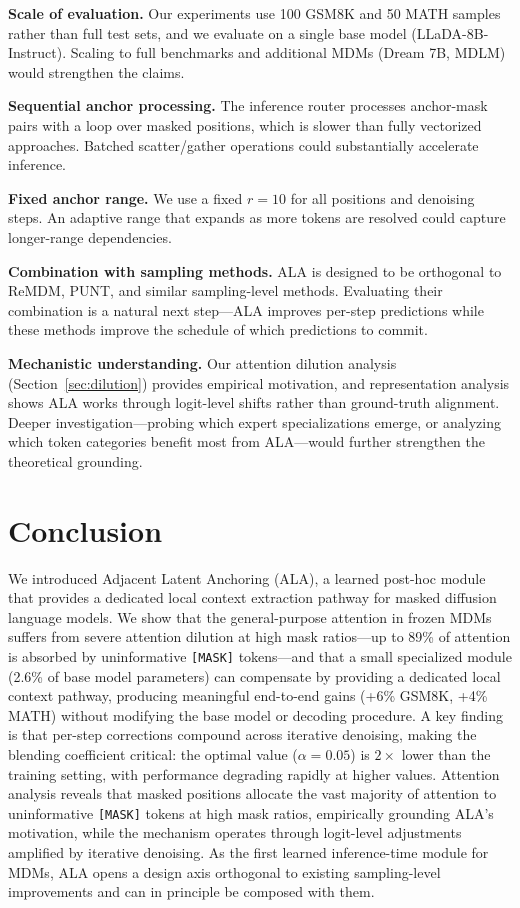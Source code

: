 \documentclass{article} %
\begin{document}
\textbf{Scale of evaluation.}
Our experiments use 100 GSM8K and 50 MATH samples rather than full test sets, and we evaluate on a single base model (LLaDA-8B-Instruct).
Scaling to full benchmarks and additional MDMs (Dream 7B, MDLM) would strengthen the claims.

\textbf{Sequential anchor processing.}
The inference router processes anchor-mask pairs with a loop over masked positions, which is slower than fully vectorized approaches.
Batched scatter/gather operations could substantially accelerate inference.

\textbf{Fixed anchor range.}
We use a fixed $r{=}10$ for all positions and denoising steps.
An adaptive range that expands as more tokens are resolved could capture longer-range dependencies.

\textbf{Combination with sampling methods.}
ALA is designed to be orthogonal to ReMDM, PUNT, and similar sampling-level methods.
Evaluating their combination is a natural next step---ALA improves per-step predictions while these methods improve the schedule of which predictions to commit.

\textbf{Mechanistic understanding.}
Our attention dilution analysis (Section~\ref{sec:dilution}) provides empirical motivation, and representation analysis shows ALA works through logit-level shifts rather than ground-truth alignment.
Deeper investigation---probing which expert specializations emerge, or analyzing which token categories benefit most from ALA---would further strengthen the theoretical grounding.


\section{Conclusion}
\label{sec:conclusion}

We introduced Adjacent Latent Anchoring (ALA), a learned post-hoc module that provides a dedicated local context extraction pathway for masked diffusion language models.
We show that the general-purpose attention in frozen MDMs suffers from severe attention dilution at high mask ratios---up to 89\% of attention is absorbed by uninformative \texttt{[MASK]} tokens---and that a small specialized module (2.6\% of base model parameters) can compensate by providing a dedicated local context pathway, producing meaningful end-to-end gains (+6\% GSM8K, +4\% MATH) without modifying the base model or decoding procedure.
A key finding is that per-step corrections compound across iterative denoising, making the blending coefficient critical: the optimal value ($\alpha{=}0.05$) is $2\times$ lower than the training setting, with performance degrading rapidly at higher values.
Attention analysis reveals that masked positions allocate the vast majority of attention to uninformative \texttt{[MASK]} tokens at high mask ratios, empirically grounding ALA's motivation, while the mechanism operates through logit-level adjustments amplified by iterative denoising.
As the first learned inference-time module for MDMs, ALA opens a design axis orthogonal to existing sampling-level improvements and can in principle be composed with them.
\end{document}
